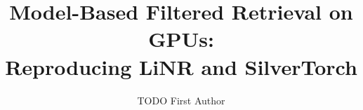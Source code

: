 \documentclass[runningheads]{llncs}
\newif\ifanonymous
\begin{document}
\title{Model-Based Filtered Retrieval on GPUs:\texorpdfstring{\\}{ }Reproducing LiNR and SilverTorch}

\ifanonymous
  \author{Anonymous Author(s)}
  \authorrunning{Anonymous}
  \institute{Anonymous Institution}
\else
  \author{TODO First Author}
\fi

\maketitle














\nocite{*}



\end{document}
